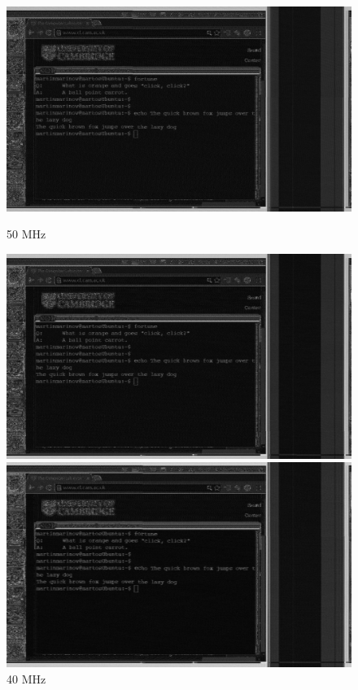 \documentclass[a4paper,12pt,twoside,openright]{report}
\begin{document}
\begin{figure}[h!]
  \centering
    \includegraphics[width=\linewidth]{sr_50MHz_at_190MHz}
  \caption{50 MHz}
\endminipage\hfill
{}
  \centering
    \includegraphics[width=\linewidth]{sr_40MHz_at_190MHz}
  \caption{40 MHz}
\endminipage\hfill
{}
  \centering
    \includegraphics[width=\linewidth]{sr_30MHz_at_190MHz}

\end{figure}
\end{document}
